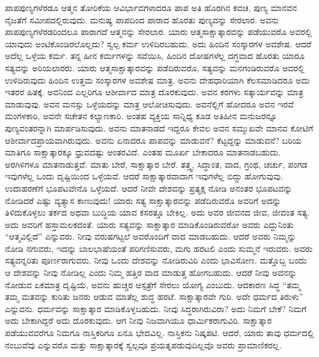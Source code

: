 ಪಾಪಪುಣ್ಯಗಳೆರಡೂ ಆತ್ಮನ ತೋರಿಕೆಯ ಆವಿರ್ಭಾವಗಳಾದರೂ ಪಾಪ ಅತಿ ಹೊರಗಿನ ಕವಚ, ಪುಣ್ಯ ಮಾನವನ ನೈಜತೆಗೆ ಸಮೀಪದಲ್ಲಿರುವುದು. ಮನುಷ್ಯ ಪಾಪದಿಂದ ಪಾರಾದ ಹೊರತು ಪುಣ್ಯವನ್ನು ಸೇರಲಾರ. ಅವನು ಪಾಪಪುಣ್ಯಗಳೆರಡರಿಂದಲೂ ಪಾರಾಗದೆ ಆತ್ಮನನ್ನು ಸೇರಲಾರ. ಯಾರು ಆತ್ಮಸಾಕ್ಷಾತ್ಕಾರವನ್ನು ಪಡೆಯುವರೊ ಅವರಲ್ಲಿ ಯಾವುದು ಅಂಟಿಕೊಂಡಿರಲೊಲ್ಲದು? ಸ್ವಲ್ಪ ಕರ್ಮ ಉಳಿದಿರಬಹುದು. ಅದು ಹಿಂದಿನ ಸಂಸ್ಕಾರಗಳ ಅವಶೇಷ. ಆದರೆ ಅದೆಲ್ಲ ಒಳ್ಳೆಯ ಕರ್ಮ. ತನ್ನ ಹೀನ ಕರ್ಮಗಳನ್ನು ಸವೆಯಿಸಿ, ಹಿಂದಿನ ದೋಷಗಳೆಲ್ಲ ದಗ್ಧವಾದ ಹೊರತು ಯಾರೂ ಸತ್ಯವನ್ನು ಅರಿಯಲಾರರು. ಯಾರು ಆತ್ಮಸಾಕ್ಷಾತ್ಕಾರವನ್ನು ಪಡೆದಿರುವರೊ, ಸತ್ಯವನ್ನು ಮನಗಂಡಿರುವರೊ ಅವರಲ್ಲಿ ಉಳಿದಿರುವುದು ಹಿಂದಿನ ಉತ್ತಮ ಸಂಸ್ಕಾರಗಳ ಅವಶೇಷ ಮಾತ್ರ. ಅವನು ದೇಹಧಾರಿಯಾಗಿ ಕೆಲಸಮಾಡಿದರೂ ಅದು ಇತರರ ಹಿತಕ್ಕೆ. ಅವನಿಂದ ಎಲ್ಲರಿಗೂ ಆಶೀರ್ವಾದ ಮಾತ್ರ ದೊರಕುವುದು. ಅವನ ಕರಗಳು ಸತ್ಕಾರ್ಯವನ್ನು ಮಾತ್ರ ಮಾಡುವುವು. ಅವನ ಮನಸ್ಸು ಒಳ್ಳೆಯದನ್ನು ಮಾತ್ರ ಆಲೋಚಿಸುವುದು. ಅವನೆಲ್ಲಿಗೆ ಹೋದರೂ ಅವನ ಇರವೆ ಮಂಗಳಕಾರಿ, ಅವನೇ ಸಚೇತನ ಕಲ್ಯಾಣಕಾರಿ. ಅಂತಹ ವ್ಯಕ್ತಿಯ ಸಾನ್ನಿಧ್ಯ ಕೂಡ ಅತಿಹೀನ ಮನುಜರನ್ನೂ ಪುಣ್ಯವಂತರನ್ನಾಗಿ ಮಾರ್ಪಡಿಸುವುದು. ಅವನು ಮಾತನಾಡದೆ ಇದ್ದರೂ ಕೇವಲ ಅವನ ಸಮ್ಮುಖವೇ ಮಾನವ ಕೋಟಿಗೆ ಆಶೀರ್ವಾದಪ್ರಾಯವಾಗಿರುವುದು. ಅವನು ಏನಾದರೂ ಪಾಪವನ್ನು ಮಾಡುವನೆ? ಕೆಟ್ಟದ್ದನ್ನು ಮಾಡುವನೆ? ಬರಿಯ ಮಾತಿಗೂ ಸಾಕ್ಷಾತ್ಕಾರಕ್ಕೂ ಧ್ರುವದಷ್ಟು ಅಂತರವಿದೆ. ಎಂತಹ ಮೂರ್ಖ ಬೇಕಾದರೂ ಮಾತನಾಡಬಹುದು. ಅರಗಿಳಿಗಳೂ ಮಾತನಾಡುತ್ತವೆ. ಮಾತು ಬೇರೆ, ಸಾಕ್ಷಾತ್ಕಾರ ಬೇರೆ. ತತ್ತ್ವ, ಸಿದ್ಧಾಂತ, ವಾದ, ಗ್ರಂಥ, ಚರ್ಚು, ಪಂಗಡ ಇವುಗಳೆಲ್ಲ ಒಂದು ದೃಷ್ಟಿಯಿಂದ ಒಳ್ಳೆಯವೆ. ಆದರೆ ಸಾಕ್ಷಾತ್ಕಾರವಾದಾಗ ಇವುಗಳೆಲ್ಲ ಬಿದ್ದು ಹೋಗುವುವು. ಉದಾಹರಣೆಗೆ ಭೂಪಟವೇನೊ ಒಳ್ಳೆಯದೆ. ಆದರೆ ನೀವೇ ದೇಶವನ್ನು ಪ್ರತ್ಯಕ್ಷ ನೋಡಿ ಅನಂತರ ಭೂಪಟವನ್ನು ನೋಡಿದರೆ ಎಷ್ಟು ವ್ಯತ್ಯಾಸ ಕಾಣುವುದು! ಯಾರು ಸತ್ಯ ಸಾಕ್ಷಾತ್ಕಾರವನ್ನು ಪಡೆದಿರುವರೊ ಅವರಿಗೆ ಅದನ್ನು ತಿಳಿದುಕೊಳ್ಳಲು ತರ್ಕದ ಅಥವಾ ಬುದ್ಧಿಯ ಯಾವ ಕಸರತ್ತೂ ಬೇಕಿಲ್ಲ. ಅದು ಅವರ ಜೀವನದ ಜೀವ, ಜೀವಂತ ಸತ್ಯ. ಅದು ಅವರಿಗೆ ಹಸ್ತಾಮಲಕದಂತೆ. ಯಾರು ಸತ್ಯವನ್ನು ಸಾಕ್ಷಾತ್ಕಾರ ಮಾಡಿಕೊಂಡಿರುವರೋ ಅವರು ಎದ್ದುನಿಂತು “ಆತ್ಮವಿಲ್ಲಿದೆ” ಎನ್ನುವರು. ನೀವು ವರುಷಗಟ್ಟಲೆ ಅವರೊಂದಿಗೆ ವಾದ ಮಾಡಬಹುದು. ಆದರೆ ಅವರು ನಿಮ್ಮನ್ನು ನೋಡಿ ನಗುವರು, ಇದನ್ನು ಬಾಲಭಾಷೆಯಂತೆ ಪರಿಗಣಿಸುವರು, ಮಗು ಹರಟಲಿ ಎಂದು ಸುಮ್ಮನೆ ಇರುವರು. ಅವರು ಸತ್ಯವನ್ನರಿತು ಪೂರ್ಣರಾಗುವರು. ನೀವು ಒಂದು ದೇಶವನ್ನು ನೋಡಿರುವಿರಿ ಎಂದು ಭಾವಿಸೋಣ. ಮತ್ತೊಬ್ಬ ಬಂದು ಆ ದೇಶವನ್ನು ನೀವು ನೋಡಿಲ್ಲ ಎಂದು ನಿಮ್ಮ ಹತ್ತಿರ ವಾದ ಮಾಡುತ್ತ ಹೋಗಬಹುದು. ಆದರೆ ನೀವು ಅವನನ್ನು ನೋಡುವ ಏಕಮಾತ್ರ ದೃಷ್ಟಿಯೆ, ಅವನು ಹುಚ್ಚರ ಆಸ್ಪತ್ರೆಗೆ ಸೇರಲು ಯೋಗ್ಯ ಎಂಬುದು. ಆದಕಾರಣ ಸಿದ್ಧ “ತಮ್ಮ ತಮ್ಮ ಮತವನ್ನು ಕುರಿತು ಜನರು ಆಡುವ ಮಾತೆಲ್ಲ ಶುದ್ಧ ಹರಟೆ. ಸಾಕ್ಷಾತ್ಕಾರವೇ ಗುರಿ. ಅದೇ ಧರ್ಮದ ತಿರುಳು” ಎನ್ನುವನು. ಧರ್ಮವನ್ನು ಸಾಕ್ಷಾತ್ಕಾರ ಮಾಡಿಕೊಳ್ಳಬಹುದು. ನೀವು ಸಿದ್ಧರಾಗಿರುವಿರಾ? ಅದು ನಿಮಗೆ ಬೇಕೆ? ನಿಮಗೆ ಅದು ಬೇಕಾಗಿದ್ದರೆ ಅದು ದೊರಕುವುದು. ಆಗ ನೀವು ನಿಜವಾಗಿಯೂ ಧಾರ್ಮಿಕರಾಗುವಿರಿ. ಸಾಕ್ಷಾತ್ಕಾರ ಪಡೆಯುವವರೆಗೂ ನಿಮಗೂ ನಾಸ್ತಿಕರಿಗೂ ಏನೂ ಭೇದವಿಲ್ಲ. ನಾಸ್ತಿಕನು ನಿಷ್ಕಪಟಿ. ಆದರೆ, ಯಾರು ತಾವು ಧರ್ಮದಲ್ಲಿ ನಂಬುವೆವು ಎನ್ನುವರೊ ಮತ್ತು ಸಾಕ್ಷಾತ್ಕಾರಕ್ಕೆ ಸ್ವಲ್ಪವೂ ಪ್ರಯತ್ನಪಡುವುದಿಲ್ಲವೊ ಅವರು ಪ್ರಾಮಾಣಿಕರಲ್ಲ.

\vskip 0.2cm

